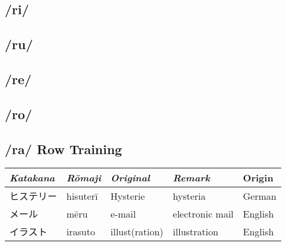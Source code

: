  

\subsection{/ri/} \label{sec:KatakanaRi}

 

\subsection{/ru/} \label{sec:KatakanaRu}

 

\subsection{/re/} \label{sec:KatakanaRe}

 

\subsection{/ro/} \label{sec:KatakanaRa}

 

\subsection{/ra/ Row Training}
\Padding
\begin{longtable}[c]{p{2cm}p{1.5cm}p{2.5cm}p{3cm}p{6cm}}
\textit{Katakana}&\textit{Rōmaji}&\textit{Original}&\textit{Remark}&Origin\\\hline
ヒステリー  &hisuterī  &Hysterie      &hysteria               &German\\
メール      &mēru      &e-mail        &electronic mail        &English\\
イラスト    &irasuto   &illust(ration)&illustration           &English\\
\end{longtable}
\Padding



